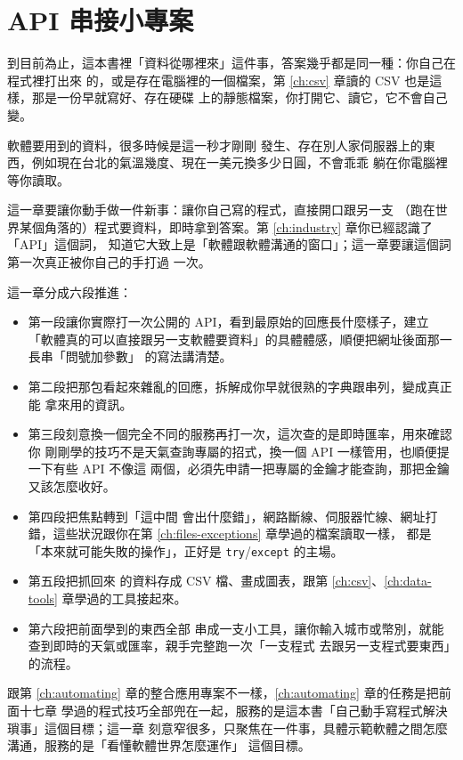 \chapter{API 串接小專案}
\label{ch:api}

到目前為止，這本書裡「資料從哪裡來」這件事，答案幾乎都是同一種：你自己在程式裡打出來
的，或是存在電腦裡的一個檔案，第 \ref{ch:csv} 章讀的 CSV 也是這樣，那是一份早就寫好、存在硬碟
上的靜態檔案，你打開它、讀它，它不會自己變。

軟體要用到的資料，很多時候是這一秒才剛剛
發生、存在別人家伺服器上的東西，例如現在台北的氣溫幾度、現在一美元換多少日圓，不會乖乖
躺在你電腦裡等你讀取。

這一章要讓你動手做一件新事：讓你自己寫的程式，直接開口跟另一支
（跑在世界某個角落的）程式要資料，即時拿到答案。第 \ref{ch:industry} 章你已經認識了「API」這個詞，
知道它大致上是「軟體跟軟體溝通的窗口」；這一章要讓這個詞第一次真正被你自己的手打過
一次。

這一章分成六段推進：

\begin{itemize}
\item 第一段讓你實際打一次公開的 API，看到最原始的回應長什麼樣子，建立
「軟體真的可以直接跟另一支軟體要資料」的具體體感，順便把網址後面那一長串「問號加參數」
的寫法講清楚。
\item 第二段把那包看起來雜亂的回應，拆解成你早就很熟的字典跟串列，變成真正能
拿來用的資訊。
\item 第三段刻意換一個完全不同的服務再打一次，這次查的是即時匯率，用來確認你
剛剛學的技巧不是天氣查詢專屬的招式，換一個 API 一樣管用，也順便提一下有些 API 不像這
兩個，必須先申請一把專屬的金鑰才能查詢，那把金鑰又該怎麼收好。
\item 第四段把焦點轉到「這中間
會出什麼錯」，網路斷線、伺服器忙線、網址打錯，這些狀況跟你在第 \ref{ch:files-exceptions} 章學過的檔案讀取一樣，
都是「本來就可能失敗的操作」，正好是 \texttt{try}/\texttt{except} 的主場。
\item 第五段把抓回來
的資料存成 CSV 檔、畫成圖表，跟第 \ref{ch:csv}、\ref{ch:data-tools} 章學過的工具接起來。
\item 第六段把前面學到的東西全部
串成一支小工具，讓你輸入城市或幣別，就能查到即時的天氣或匯率，親手完整跑一次「一支程式
去跟另一支程式要東西」的流程。
\end{itemize}

跟第 \ref{ch:automating} 章的整合應用專案不一樣，\ref{ch:automating} 章的任務是把前面十七章
學過的程式技巧全部兜在一起，服務的是這本書「自己動手寫程式解決瑣事」這個目標；這一章
刻意窄很多，只聚焦在一件事，具體示範軟體之間怎麼溝通，服務的是「看懂軟體世界怎麼運作」
這個目標。

